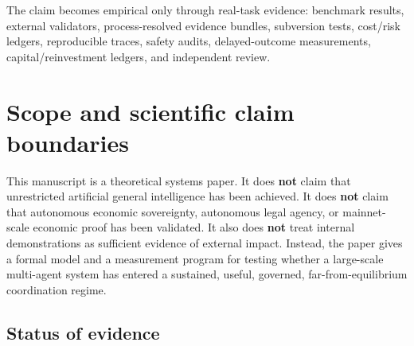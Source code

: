 \documentclass[11pt]{article}
\begin{document}
The claim becomes empirical only through real-task evidence: benchmark results, external validators, process-resolved evidence bundles, subversion tests, cost/risk ledgers, reproducible traces, safety audits, delayed-outcome measurements, capital/reinvestment ledgers, and independent review.

\section{Scope and scientific claim boundaries}\label{scope-and-scientific-claim-boundaries}

This manuscript is a theoretical systems paper. It does \textbf{not} claim that unrestricted artificial general intelligence has been achieved. It does \textbf{not} claim that autonomous economic sovereignty, autonomous legal agency, or mainnet-scale economic proof has been validated. It also does \textbf{not} treat internal demonstrations as sufficient evidence of external impact. Instead, the paper gives a formal model and a measurement program for testing whether a large-scale multi-agent system has entered a sustained, useful, governed, far-from-equilibrium coordination regime.

\subsection{Status of evidence}\label{status-of-evidence}
\end{document}
